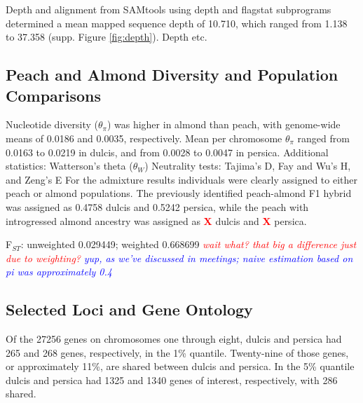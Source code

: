 \documentclass[12pt]{article}
\newcommand{\X}{\textcolor{red}{\bf X }}
\newcommand{\jri}[1]{\textcolor{red}{\emph{#1}}}
\newcommand{\dv}[1]{\textcolor{blue}{\emph{#1}}}
\begin{document}
Depth and alignment from SAMtools using depth and flagstat subprograms \citep{li2009sequence} determined a mean mapped sequence depth of 10.710, which ranged from 1.138 to 37.358 (supp. Figure \ref{fig:depth}).
%
%
Depth etc.
%
\subsection*{Peach and Almond Diversity and Population Comparisons}

Nucleotide diversity ($\theta_{\pi}$) was higher in almond than peach, with genome-wide means of 0.0186 and 0.0035, respectively. 
%
Mean per chromosome $\theta_{\pi}$ ranged from 0.0163 to 0.0219 in dulcis, and from 0.0028 to 0.0047 in persica.
Additional statistics: Watterson's theta ($\theta_{W}$)
Neutrality tests: Tajima's D, Fay and Wu's H, and Zeng's E
%
For the admixture results individuals were clearly assigned to either peach or almond populations. 
%
The previously identified peach-almond F1 hybrid was assigned as 0.4758 dulcis and 0.5242 persica, while the peach with introgressed almond ancestry was assigned as \X dulcis and \X persica.
%

F$_{ST}$: unweighted 0.029449; weighted 0.668699 \jri{wait what? that big a difference just due to weighting?} \dv{yup, as we've discussed in meetings; naive estimation based on pi was approximately 0.4}
%
\subsection*{Selected Loci and Gene Ontology}

Of the 27256 genes on chromosomes one through eight, dulcis and persica had 265 and 268 genes, respectively, in the 1\% quantile. 
%
Twenty-nine of those genes, or approximately 11\%, are shared between dulcis and persica.
%
In the 5\% quantile dulcis and persica had 1325 and 1340 genes of interest, respectively, with 286 shared.
\\
\end{document}
